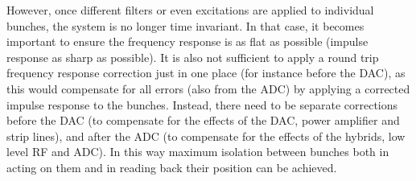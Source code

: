 \documentclass[a4paper]{jacow}
\begin{document}
However, once different filters or even excitations are applied to individual bunches, the system is no longer time invariant. In that case, it becomes important to ensure the frequency response is as flat as possible (impulse response as sharp as possible). It is also not sufficient to apply a round trip frequency response correction just in one place (for instance before the DAC), as this would compensate for all errors (also from the ADC) by applying a corrected impulse response to the bunches. Instead, there need to be separate corrections before the DAC (to compensate for the effects of the DAC, power amplifier and strip lines), and after the ADC (to compensate for the effects of the hybrids, low level RF and ADC). In this way maximum isolation between bunches both in acting on them and in reading back their position can be achieved.
\end{document}
